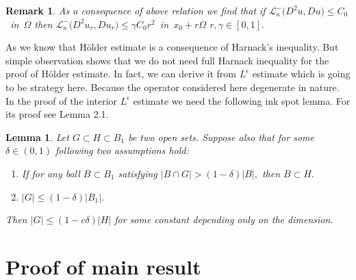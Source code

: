 \documentclass{amsart}
\theoremstyle{plain}
\newtheorem{lemma}[theorem]{Lemma}
\newtheorem{remark}[theorem]{Remark}
\numberwithin{equation}{section}
\begin{document}
\begin{remark}\label{remsc}
As a consequence of above relation we find that if $\mathcal{L}_{\kappa}^{-}\big(D^{2}u,Du\big)\leq C_{0}$~in~$\Omega$ then 
$\mathcal{L}_{\kappa}^{-}\big(D^{2}u_{r},Du_{r}\big)\leq \gamma C_{0}r^{2}$~in~$x_{0}+r\Omega$  $r,\gamma\in[0,1].$ 
\end{remark}
As we know that H\"{o}lder estimate is a consequence of Harnack's inequality. But simple observation shows that we do not need full Harnack inequality for the proof of H\"{o}lder estimate. In fact, we can derive it from $L^{\epsilon}$ estimate which is going to be strategy here. Because the operator considered here degenerate in nature. In the proof of the interior $L^{\epsilon}$ estimate we need the following ink spot lemma. For its proof see Lemma 2.1\cite{imbert2016estimates}.
\begin{lemma}\label{covering1}
Let $G\subset H\subset B_{1}$ be two open sets. Suppose also that for some $\delta\in(0,1)$ following two assumptions hold:
\begin{enumerate}
\item{} If for any ball $B\subset B_{1}$ satisfying $|B\cap G|>(1-\delta)|B|,$ then $B\subset H.$
\item{}$|G|\leq (1-\delta)|B_{1}|.$
\end{enumerate}
Then $|G|\leq (1-c\delta)|H|$ for some constant depending only on the dimension.
\end{lemma}
\section{Proof of main result}
\end{document}
